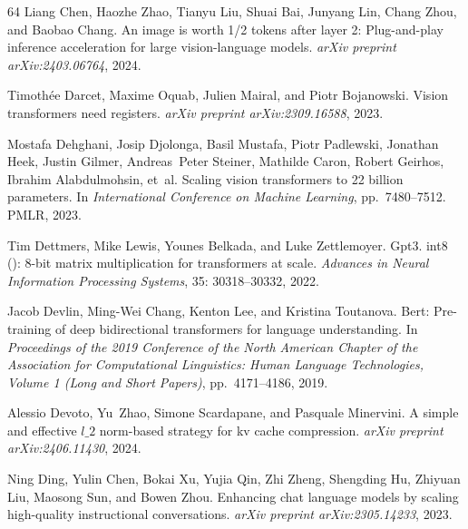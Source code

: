 \documentclass{article} \usepackage{iclr2025_conference,times}
\begin{document}
\begin{thebibliography}{64}
Liang Chen, Haozhe Zhao, Tianyu Liu, Shuai Bai, Junyang Lin, Chang Zhou, and Baobao Chang.
\newblock An image is worth 1/2 tokens after layer 2: Plug-and-play inference acceleration for large vision-language models.
\newblock \emph{arXiv preprint arXiv:2403.06764}, 2024.

Timoth{\'e}e Darcet, Maxime Oquab, Julien Mairal, and Piotr Bojanowski.
\newblock Vision transformers need registers.
\newblock \emph{arXiv preprint arXiv:2309.16588}, 2023.

Mostafa Dehghani, Josip Djolonga, Basil Mustafa, Piotr Padlewski, Jonathan Heek, Justin Gilmer, Andreas~Peter Steiner, Mathilde Caron, Robert Geirhos, Ibrahim Alabdulmohsin, et~al.
\newblock Scaling vision transformers to 22 billion parameters.
\newblock In \emph{International Conference on Machine Learning}, pp.\  7480--7512. PMLR, 2023.

Tim Dettmers, Mike Lewis, Younes Belkada, and Luke Zettlemoyer.
\newblock Gpt3. int8 (): 8-bit matrix multiplication for transformers at scale.
\newblock \emph{Advances in Neural Information Processing Systems}, 35: 30318--30332, 2022.

Jacob Devlin, Ming-Wei Chang, Kenton Lee, and Kristina Toutanova.
\newblock Bert: Pre-training of deep bidirectional transformers for language understanding.
\newblock In \emph{Proceedings of the 2019 Conference of the North American Chapter of the Association for Computational Linguistics: Human Language Technologies, Volume 1 (Long and Short Papers)}, pp.\  4171--4186, 2019.

Alessio Devoto, Yu~Zhao, Simone Scardapane, and Pasquale Minervini.
\newblock A simple and effective $ l\_2 $ norm-based strategy for kv cache compression.
\newblock \emph{arXiv preprint arXiv:2406.11430}, 2024.

Ning Ding, Yulin Chen, Bokai Xu, Yujia Qin, Zhi Zheng, Shengding Hu, Zhiyuan Liu, Maosong Sun, and Bowen Zhou.
\newblock Enhancing chat language models by scaling high-quality instructional conversations.
\newblock \emph{arXiv preprint arXiv:2305.14233}, 2023.


\end{thebibliography}
\end{document}
